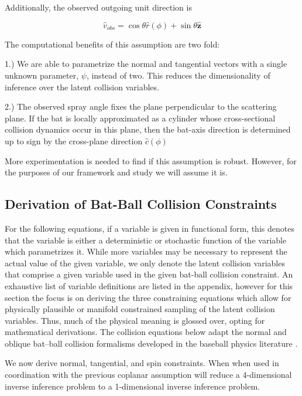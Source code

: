 \documentclass[11pt]{article}
\begin{document}
Additionally, the observed outgoing unit direction is

\begin{equation}
\hat{v}_{obs} = \cos \theta \hat{r}(\phi) + \sin \theta \hat{\mathbf{z}}
  \tag{9}
  \end{equation}

The computational benefits of this assumption are two fold:

1.) We are able to parametrize the normal and tangential vectors with a single unknown parameter, \(\psi\), instead of two. This reduces the dimensionality of inference over the latent collision variables.

2.) The observed spray angle fixes the plane perpendicular to the scattering plane. If the bat is locally approximated as a cylinder whose cross-sectional collision dynamics occur in this plane, then the bat-axis direction is determined up to sign by the cross-plane direction $\hat{c}(\phi)$

More experimentation is needed to find if this assumption is robust. However, for the purposes of our framework and study we will assume it is.

\subsection{Derivation of Bat-Ball Collision Constraints}

For the following equations, if a variable is given in functional form, this denotes that the variable is either a deterministic or stochastic function of the variable which parametrizes it. While more variables may be necessary to represent the actual value of the given variable, we only denote the latent collision variables that comprise a given variable used in the given bat-ball collision constraint. An exhaustive list of variable definitions are listed in the appendix, however for this section the focus is on deriving the three constraining equations which allow for physically plausible or manifold constrained sampling of the latent collision variables. Thus, much of the physical meaning is glossed over, opting for mathematical derivations. The collision equations below adapt the normal and oblique bat--ball collision formalisms developed in the baseball physics literature \citep{nathan2000dynamics,nathan2003characterizing,cross2006scattering,kensrud2017oblique}.

We now derive normal, tangential, and spin constraints. When when used in coordination with the previous coplanar assumption will reduce a 4-dimensional inverse inference problem to a 1-dimensional inverse inference problem.
\end{document}
